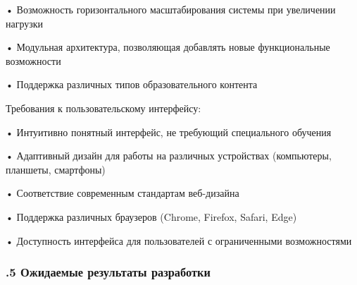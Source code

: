 {  \par \redline • Возможность горизонтального масштабирования системы при увеличении нагрузки
  \par \redline • Модульная архитектура, позволяющая добавлять новые функциональные возможности
  \par \redline • Поддержка различных типов образовательного контента

  \par \redline Требования к пользовательскому интерфейсу:

  \par \redline • Интуитивно понятный интерфейс, не требующий специального обучения
  \par \redline • Адаптивный дизайн для работы на различных устройствах (компьютеры, планшеты, смартфоны)
  \par \redline • Соответствие современным стандартам веб-дизайна
  \par \redline • Поддержка различных браузеров (Chrome, Firefox, Safari, Edge)
  \par \redline • Доступность интерфейса для пользователей с ограниченными возможностями

  \par
}

\subtitlespace

\subsubsection*{ 
  \gostTitleFont
  .5 Ожидаемые результаты разработки
} 

\subtitlespace

